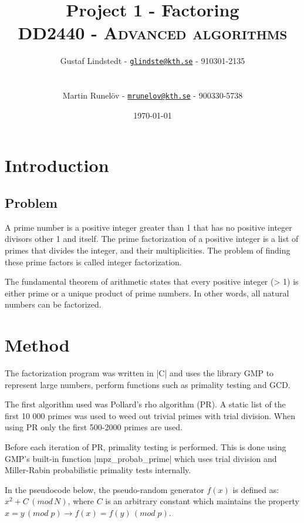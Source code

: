 \documentclass[paper=a4, fontsize=11pt,numbers=endperiod]{scrartcl} %
\title{	
\huge Project 1 - Factoring \\ %
\vspace{10pt}
\normalfont \normalsize 
\textsc{DD2440 - Advanced algorithms } \\ [25pt] %
}
\author{\vspace{-20pt} Gustaf Lindstedt - \href{mailto:glindste@kth.se}{\color{RoyalBlue}\nolinkurl{glindste@kth.se}} - 910301-2135\\\\\\Martin Runelöv - \href{mailto:mrunelov@kth.se}{\color{RoyalBlue}\nolinkurl{mrunelov@kth.se}} - 900330-5738}
\date{\vspace{8pt}\normalsize\today} %
\numberwithin{equation}{section} %
\numberwithin{figure}{section} %
\numberwithin{table}{section} %
\begin{document}
\maketitle %


\section{Introduction}

\subsection{Problem}
A prime number is a positive integer greater than 1 that has no positive integer divisors other 1 and itself. The prime factorization of a positive integer is a list of primes that divides the integer, and their multiplicities. The problem of finding these prime factors is called integer factorization.

The fundamental theorem of arithmetic states that every positive integer (> 1) is either prime or a unique product of prime numbers. In other words, all natural numbers can be factorized.



\section{Method}
The factorization program was written in |C| and uses the library GMP\cite{gmp} to represent large numbers, perform functions such as primality testing and GCD.

The first algorithm used was Pollard's rho algorithm (PR). A static list of the first 10 000 primes was used to weed out trivial primes with trial division. When using PR only the first 500-2000 primes are used.

Before each iteration of PR, primality testing is performed. This is done using GMP's built-in function |mpz_probab_prime| which uses trial division and Miller-Rabin probabilistic primality tests internally.\cite{probabprime}


In the pseudocode below, the pseudo-random generator $f(x)$ is defined as: $x^2+C\, (mod\, N)$, where $C$ is an arbitrary constant which maintains the property $x = y\, (mod\; p) \rightarrow f(x) = f(y)\,(mod\; p)$.\\
\end{document}
